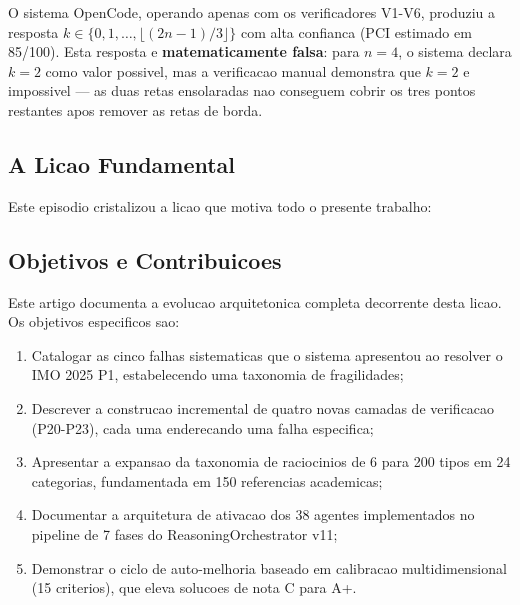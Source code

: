 \documentclass[5p]{elsarticle}
\begin{document}
O sistema OpenCode, operando apenas com os verificadores V1-V6, produziu a
resposta $k\in\{0,1,\dots,\lfloor(2n-1)/3\rfloor\}$ com alta confianca
(PCI estimado em 85/100). Esta resposta e \textbf{matematicamente falsa}:
para $n=4$, o sistema declara $k=2$ como valor possivel, mas a verificacao
manual demonstra que $k=2$ e impossivel --- as duas retas ensolaradas nao
conseguem cobrir os tres pontos restantes apos remover as retas de borda.

\subsection{A Licao Fundamental}

Este episodio cristalizou a licao que motiva todo o presente trabalho:

\begin{center}
\end{center}

\subsection{Objetivos e Contribuicoes}

Este artigo documenta a evolucao arquitetonica completa decorrente desta licao.
Os objetivos especificos sao:

\begin{enumerate}[label=(\roman*)]
  \item Catalogar as cinco falhas sistematicas que o sistema apresentou ao
    resolver o IMO 2025 P1, estabelecendo uma taxonomia de fragilidades;
  \item Descrever a construcao incremental de quatro novas camadas de
    verificacao (P20-P23), cada uma enderecando uma falha especifica;
  \item Apresentar a expansao da taxonomia de raciocinios de 6 para 200 tipos
    em 24 categorias, fundamentada em 150 referencias academicas;
  \item Documentar a arquitetura de ativacao dos 38 agentes implementados no
    pipeline de 7 fases do ReasoningOrchestrator v11;
  \item Demonstrar o ciclo de auto-melhoria baseado em calibracao
    multidimensional (15 criterios), que eleva solucoes de nota C para A+.
\end{enumerate}
\end{document}
